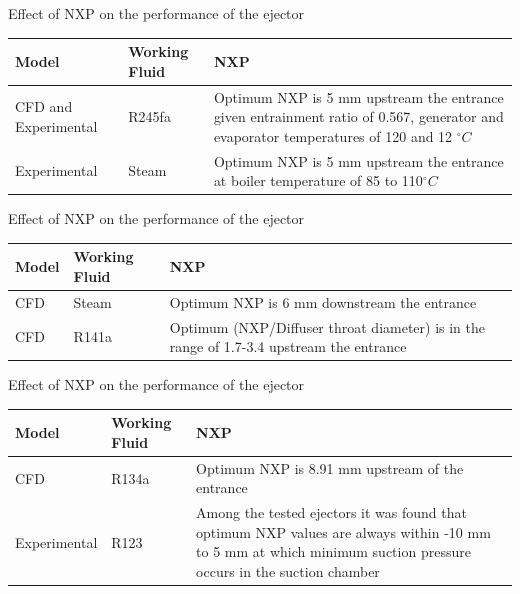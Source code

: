 \begin{frame}{Effect of NXP on the performance of the ejector\cite{tashtoush2019comprehensive}}
    \begin{table}[h]
        \centering
        \begin{tabular}{|p{2cm}|p{1.5cm}|p{5cm}|}
        \hline
            Model & Working Fluid & NXP\\
        \hline
             CFD and Experimental\cite{eames2007results} & R245fa & Optimum NXP is 5 mm upstream the entrance given entrainment ratio of 0.567, generator and evaporator temperatures of 120 and 12 $^{\circ}C$\\
        \hline
             Experimental\cite{meyer2009steam} & Steam & Optimum NXP is 5 mm upstream the entrance at boiler temperature of 85 to 110$^{\circ}C$ \\
        \hline
        \end{tabular}
    \end{table}
\end{frame}

\begin{frame}{Effect of NXP on the performance of the ejector\cite{tashtoush2019comprehensive}}
    \begin{table}[h]
        \centering
        \begin{tabular}{|p{2cm}|p{1.5cm}|p{4.5cm}|}
        \hline
            Model & Working Fluid & NXP\\
        \hline
             CFD \cite{varga2009influence} & Steam & Optimum NXP is 6 mm downstream the entrance\\
        \hline
             CFD\cite{zhu2009numerical} & R141a & Optimum (NXP/Diffuser throat diameter) is in the range of 1.7-3.4 upstream the entrance\\
        \hline
        \end{tabular}
    \end{table}
\end{frame}

\begin{frame}{Effect of NXP on the performance of the ejector\cite{tashtoush2019comprehensive}}
    \begin{table}[h]
        \centering
        \begin{tabular}{|p{2cm}|p{1.5cm}|p{5cm}|}
        \hline
            Model & Working Fluid & NXP\\
        \hline
             CFD \cite{yan2012geometry} & R134a & Optimum NXP is 8.91 mm upstream of the entrance\\
        \hline
             Experimental\cite{yapici2008experimental} & R123 & Among the tested ejectors it was found that optimum NXP values are always within -10 mm to 5 mm at which minimum suction pressure occurs in the suction chamber\\
        \hline
        \end{tabular}
    \end{table}
\end{frame}


